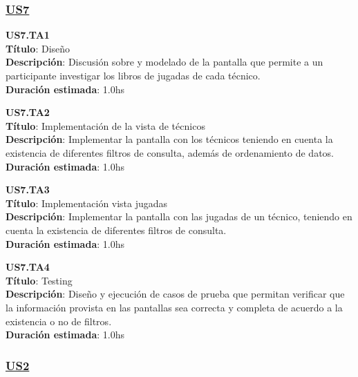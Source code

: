 \subsubsection*{\underline{US7}}

\begin{tcolorbox}
\textbf{US7.TA1} \\
\textbf{Título}: Diseño \\
\textbf{Descripción}: Discusión sobre y modelado de la pantalla que permite a un participante investigar los libros de jugadas de cada técnico.\\
\textbf{Duración estimada}: 1.0hs
\end{tcolorbox}
\vspace{10pt}

\begin{tcolorbox}
\textbf{US7.TA2} \\
\textbf{Título}: Implementación de la vista de técnicos \\
\textbf{Descripción}: Implementar la pantalla con los técnicos teniendo en cuenta la existencia de diferentes filtros de consulta, además de ordenamiento de datos.\\
\textbf{Duración estimada}: 1.0hs
\end{tcolorbox}
\vspace{10pt}

\begin{tcolorbox}
\textbf{US7.TA3} \\
\textbf{Título}: Implementación vista jugadas \\
\textbf{Descripción}: Implementar la pantalla con las jugadas de un técnico, teniendo en cuenta la existencia de diferentes filtros de consulta.\\
\textbf{Duración estimada}: 1.0hs
\end{tcolorbox}
\vspace{10pt}

\begin{tcolorbox}
\textbf{US7.TA4} \\
\textbf{Título}: Testing \\
\textbf{Descripción}: Diseño y ejecución de casos de prueba que permitan verificar que la información provista en las pantallas sea correcta y completa de acuerdo a la existencia o no de filtros.\\
\textbf{Duración estimada}: 1.0hs
\end{tcolorbox}
\vspace{10pt}

\subsubsection*{\underline{US2}}

